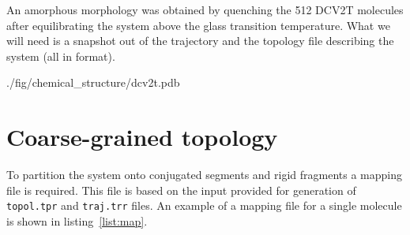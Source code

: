 An amorphous morphology was obtained by quenching the 512 DCV2T molecules after equilibrating the system above the glass transition temperature. What we will need is a snapshot out of the trajectory and the topology file describing the system (all in \gromacs format).

%
{./fig/chemical_structure/dcv2t.pdb}

\section{Coarse-grained topology}
\label{sec:coarsegrained}

To partition the system onto conjugated segments and rigid fragments a mapping \xml file is required. This file is based on the input provided for generation of \texttt{topol.tpr} and \texttt{traj.trr} files. An example of a mapping file for a single \dcvt molecule is shown in listing~\ref{list:map}. 


